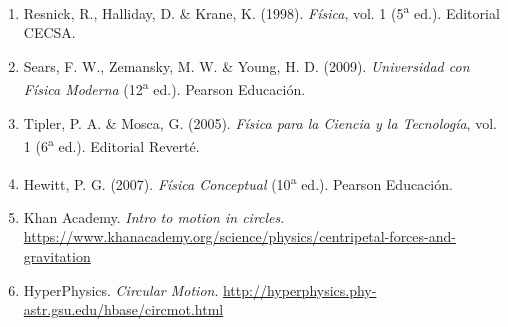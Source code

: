 \documentclass[12pt]{article}
\begin{document}
\begin{enumerate}
  \item Resnick, R., Halliday, D. \& Krane, K. (1998). \textit{Física}, vol. 1 (5\textsuperscript{a} ed.). Editorial CECSA.
  \item Sears, F. W., Zemansky, M. W. \& Young, H. D. (2009). \textit{Universidad con Física Moderna} (12\textsuperscript{a} ed.). Pearson Educación.
  \item Tipler, P. A. \& Mosca, G. (2005). \textit{Física para la Ciencia y la Tecnología}, vol. 1 (6\textsuperscript{a} ed.). Editorial Reverté.
  \item Hewitt, P. G. (2007). \textit{Física Conceptual} (10\textsuperscript{a} ed.). Pearson Educación.
  \item Khan Academy. \textit{Intro to motion in circles}. \url{https://www.khanacademy.org/science/physics/centripetal-forces-and-gravitation}
  \item HyperPhysics. \textit{Circular Motion}. \url{http://hyperphysics.phy-astr.gsu.edu/hbase/circmot.html}
\end{enumerate}
\end{document}
